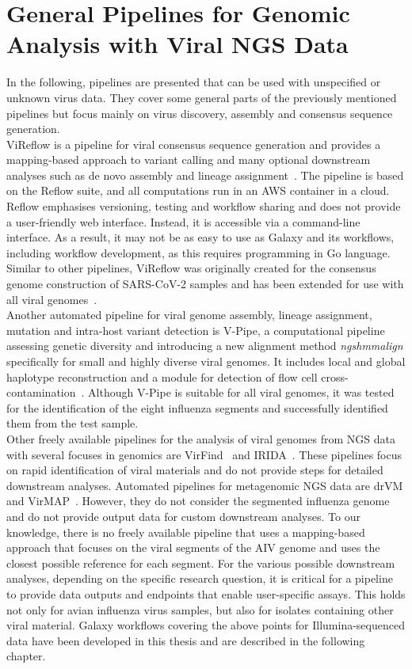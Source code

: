 \section{General Pipelines for Genomic Analysis with Viral NGS Data}\label{sec:2-general-pipelines}
In the following, pipelines are presented that can be used with unspecified or unknown virus data. They cover some general parts of the previously mentioned pipelines but focus mainly on virus discovery, assembly and consensus sequence generation. \\
ViReflow is a pipeline for viral consensus sequence generation and provides a mapping-based approach to variant calling and many optional downstream analyses such as de novo assembly and lineage assignment~\cite{moshiri2022vireflow}. The pipeline is based on the Reflow suite, and all computations run in an \ac{AWS} container in a cloud. Reflow emphasises versioning, testing and workflow sharing and does not provide a user-friendly web interface. Instead, it is accessible via a command-line interface. As a result, it may not be as easy to use as Galaxy and its workflows, including workflow development, as this requires programming in Go language. Similar to other pipelines, ViReflow was originally created for the consensus genome construction of \ac{SARS-CoV-2} samples and has been extended for use with all viral genomes~\cite{moshiri2022vireflow}. \\
Another automated pipeline for viral genome assembly, lineage assignment, mutation and intra-host variant detection is V-Pipe, a computational pipeline assessing genetic diversity and introducing a new alignment method \textit{ngshmmalign} specifically for small and highly diverse viral genomes. It includes local and global haplotype reconstruction and a module for detection of flow cell cross-contamination~\cite{posada2021v}. Although V-Pipe is suitable for all viral genomes, it was tested for the identification of the eight influenza segments and successfully identified them from the test sample. \\
Other freely available pipelines for the analysis of viral genomes from \ac{NGS} data with several focuses in genomics are VirFind~\cite{ho2014development} and \ac{IRIDA}~\cite{matthews2018integrated}. These pipelines focus on rapid identification of viral materials and do not provide steps for detailed downstream analyses. Automated pipelines for metagenomic \ac{NGS} data are \ac{drVM} and VirMAP~\cite{lin2017drvm, ajami2018maximal}. However, they do not consider the segmented influenza genome and do not provide output data for custom downstream analyses. To our knowledge, there is no freely available pipeline that uses a mapping-based approach that focuses on the viral segments of the \ac{AIV} genome and uses the closest possible reference for each segment. For the various possible downstream analyses, depending on the specific research question, it is critical for a pipeline to provide data outputs and endpoints that enable user-specific assays. This holds not only for avian influenza virus samples, but also for isolates containing other viral material. Galaxy workflows covering the above points for Illumina-sequenced data have been developed in this thesis and are described in the following chapter.
